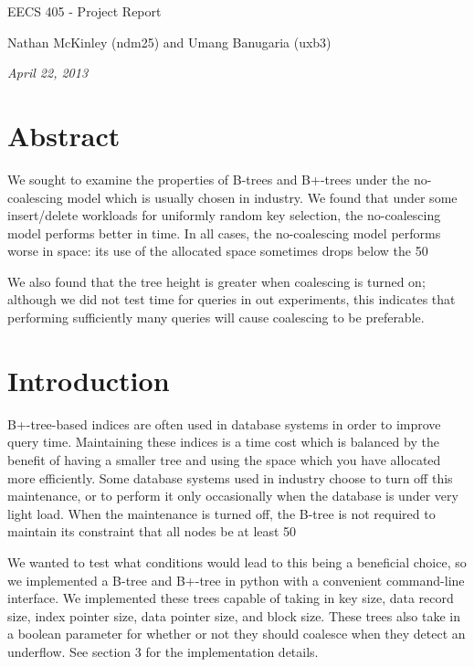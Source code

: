 \documentclass[fleqn]{article}
\begin{document}
\centerline{\sc \large EECS 405 - Project Report}
\vspace{.5pc}
\centerline{\sc Nathan McKinley (ndm25) and Umang Banugaria (uxb3)}
\centerline{\it April 22, 2013}
\vspace{2pc}

\section{Abstract}
We sought to examine the properties of B-trees and B+-trees under the no-coalescing model which is usually chosen in industry.  We found that under some insert/delete workloads for uniformly random key selection, the no-coalescing model performs better in time.  In all cases, the no-coalescing model performs worse in space: its use of the allocated space sometimes drops below the 50%

We also found that the tree height is greater when coalescing is turned on; although we did not test time for queries in out experiments, this indicates that performing sufficiently many queries will cause coalescing to be preferable.

\section{Introduction}
B+-tree-based indices are often used in database systems in order to improve query time.  Maintaining these indices is a time cost which is balanced by the benefit of having a smaller tree and using the space which you have allocated more efficiently.  Some database systems used in industry choose to turn off this maintenance, or to perform it only occasionally when the database is under very light load.  When the maintenance is turned off, the B-tree is not required to maintain its constraint that all nodes be at least 50%

We wanted to test what conditions would lead to this being a beneficial choice, so we implemented a B-tree and B+-tree in python with a convenient command-line interface.  We implemented these trees capable of taking in key size, data record size, index pointer size, data pointer size, and block size.  These trees also take in a boolean parameter for whether or not they should coalesce when they detect an underflow.  See section 3 for the implementation details.
\end{document}
